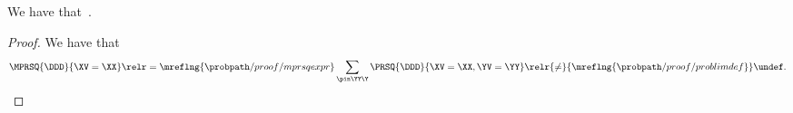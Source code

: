 \begin{proposition}
  We have that\ \mproblimdefprop.%
\end{proposition}

\begin{proof}
  We have that
  $$
    \MPRSQ{\DDD}{\XV = \XX} \relr = {\mreflng{\probpath/proof/mprsqexpr}}
    \sum_{\pin\YY\Y} \PRSQ{\DDD}{\XV = \XX, \YV = \YY} 
    \relr {\ne} {\mreflng{\probpath/proof/problimdef}} \undef.
  $$%
\end{proof}
